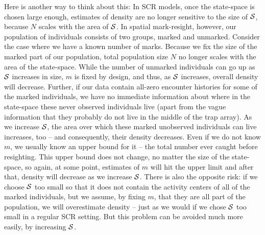 Here is another way to think about this: In SCR models, once the
state-space is chosen large enough, estimates of density are no longer
sensitive to the size of ${\cal S}$, because $N$ scales with the area
of ${\cal S}$. In spatial mark-resight, however, our population of
individuals consists of two groups, marked and unmarked. Consider the
case where we have a known number of marks. Because we fix the size of
the marked part of our population, total population size $N$ no longer
scales with the area of the state-space. While the number of unmarked
individuals can go up as ${\cal S}$ increases in size, $m$ is fixed by
design, and thus, as ${\cal S}$ increases, overall density will
decrease. Further, if our data contain all-zero encounter histories
for some of the marked individuals, we have no immediate information
about where in the state-space these never observed individuals live
(apart from the vague information that they probably do not live in
the middle of the trap array). As we increase ${\cal S}$, the area
over which these marked unobserved individuals can live increases, too
-- and consequently, their density decreases. Even if we do not know
$m$, we usually know an upper bound for it -- the total number ever
caught before resighting. This upper bound does not change, no matter
the size of the state-space, so again, at some point, estimates of $m$
will hit the upper limit and after that, density will decrease as we
increase ${\cal S}$. There is also the opposite risk: if we choose
${\cal S}$ too small so that it does not contain the activity centers
of all of the marked individuals, but we assume, by fixing $m$, that
they are all part of the population, we will overestimate density --
just as we would if we chose ${\cal S}$ too small in a regular SCR
setting. But this problem can be avoided much more easily, by
increasing ${\cal S}$.

